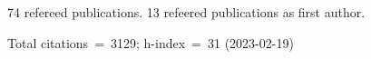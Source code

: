 74 refereed publications. 13 refeered publications as first author.

Total citations~=~3129; h-index~=~31 (2023-02-19)